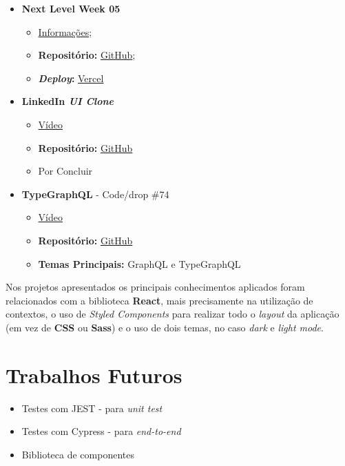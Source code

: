 \begin{minipage}[t]{0.45\textwidth}
	\begin{itemize}
		\item \textbf{Next Level Week 05}
			\begin{itemize}
				\item \href{http://nextlevelweek.com/}{Informações};
				\item \textbf{Repositório:} \href{https://github.com/TutoDS/nlw05-react}{GitHub};
				\item \textbf{\textit{Deploy}:} \href{https://podcastr-tutods.vercel.app/}{Vercel}
			\end{itemize}

		\item \textbf{LinkedIn \textit{UI Clone}}
			\begin{itemize}
				\item \href{https://www.youtube.com/watch?v=xP3cxbDUtrc}{Vídeo}
				\item \textbf{Repositório:} \href{https://github.com/TutoDS/reactjs-linkedin-clone}{GitHub}
				\item Por Concluir
			\end{itemize}

		\item \textbf{TypeGraphQL} - Code/drop \#74
			\begin{itemize}
				\item \href{https://www.youtube.com/watch?v=qMc5A5-Ktuw}{Vídeo}
				\item \textbf{Repositório:} \href{https://github.com/TutoDS/typegraphql-code-drops-74}{GitHub}
				\item \textbf{Temas Principais:} GraphQL e TypeGraphQL
			\end{itemize}
	\end{itemize}
\end{minipage}

\vspace{10pt}

Nos projetos apresentados os principais conhecimentos aplicados foram relacionados com a biblioteca \textbf{React}, mais precisamente na utilização de contextos, o uso de \textit{Styled Components} para realizar todo o \textit{layout} da aplicação (em vez de \textbf{CSS} ou \textbf{Sass}) e o uso de dois temas, no caso \textit{dark} e \textit{light mode}.

\section{Trabalhos Futuros}

\begin{itemize}
	\item Testes com JEST - para \textit{unit test}
	\item Testes com Cypress - para \textit{end-to-end}
	\item Biblioteca de componentes
\end{itemize}